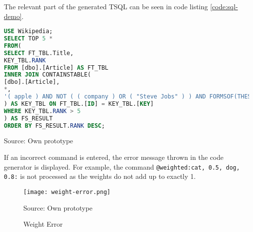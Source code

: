 The relevant part of the generated \ac{TSQL} can be seen in code listing \ref{code:sql-demo}.
\begin{codeenv}
    \label{code:sql-demo}
    \begin{lstlisting}[language=SQL, linerange={10-10}]
USE Wikipedia;
SELECT TOP 5 *
FROM(
SELECT FT_TBL.Title,
KEY_TBL.RANK
FROM [dbo].[Article] AS FT_TBL
INNER JOIN CONTAINSTABLE(
[dbo].[Article],
*,
'( apple ) AND NOT ( ( company ) OR ( "Steve Jobs" ) ) AND FORMSOF(THESAURUS,"fruit")'
) AS KEY_TBL ON FT_TBL.[ID] = KEY_TBL.[KEY]
WHERE KEY_TBL.RANK > 5
) AS FS_RESULT
ORDER BY FS_RESULT.RANK DESC;
    \end{lstlisting}
    \centerline{Source: Own prototype}
\end{codeenv}
If an incorrect command is entered, the error message thrown in the code generator is displayed. For example, the command \lstinline[language=Fulltext-Search]$@weighted:cat, 0.5, dog, 0.8:$ is not processed as the weights do not add up to exactly 1.
\begin{figure}[H]
    \caption{Weight Error}
    \label{fig:weight-error}
    \texttt{[image: weight-error.png]}
    \\
    \centerline{Source: Own prototype}
\end{figure}
